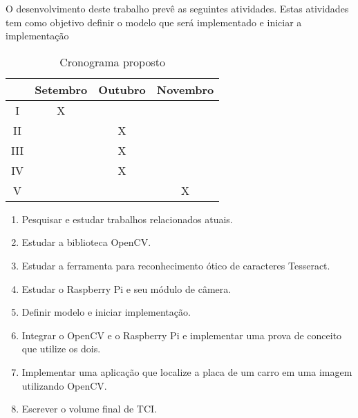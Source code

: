 O desenvolvimento deste trabalho prevê as seguintes atividades.
Estas atividades tem como objetivo definir o modelo que será implementado
e iniciar a implementação

\begin{table}[H]
\centering
\label{tab:crono}
\begin{tabular}{c|c|c|c}
    & Setembro & Outubro & Novembro \\ \hline
I   & X        &         &          \\
II  &          & X       &          \\
III &          & X       &          \\
IV  &          & X       &          \\
V   &          &         & X       
\end{tabular}
\caption{Cronograma proposto}
\end{table}

\begin{enumerate}[I]
	\item Pesquisar e estudar trabalhos relacionados atuais.
	\item Estudar a biblioteca OpenCV\@.
	\item Estudar a ferramenta para reconhecimento ótico de caracteres Tesseract.
	\item Estudar o Raspberry Pi e seu módulo de câmera.
	\item Definir modelo e iniciar implementação.
	\item Integrar o OpenCV e o Raspberry Pi e implementar uma prova de conceito que utilize os dois.
	\item Implementar uma aplicação que localize a placa de um carro em uma imagem utilizando OpenCV.
	\item Escrever o volume final de TCI.
\end{enumerate}

